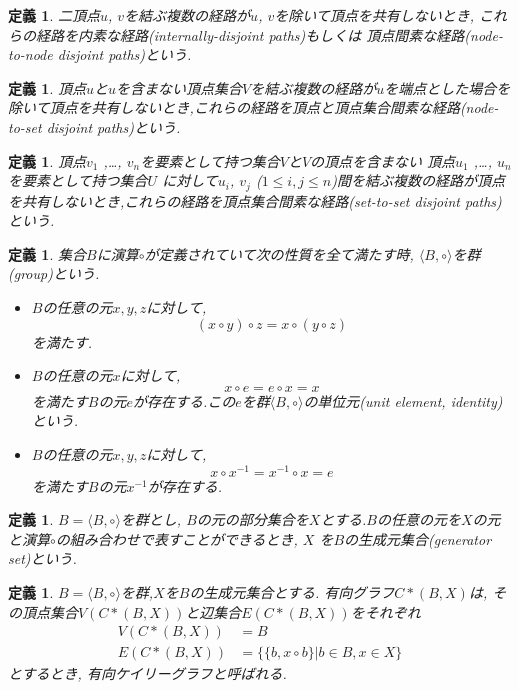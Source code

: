 \documentclass[11pt,a4j]{jsarticle}
\theoremstyle{plain}
\newtheorem{defi}[theo]{定義}
\def\vu{\mbox{\boldmath $u$}}
\def\vv{\mbox{\boldmath $v$}}
\def\node#1#2{\mbox{\boldmath $#1_{#2}$}}
\begin{document}
\begin{defi}
二頂点{\vu , \vv}を結ぶ複数の経路が{\vu , \vv}を除いて頂点を共有しないとき, これらの経路を内素な経路(internally-disjoint paths)もしくは
頂点間素な経路(node-to-node disjoint paths)という.
\end{defi}

\begin{defi}
頂点{\vu}と{\vu}を含まない頂点集合{$V$}を結ぶ複数の経路が{\vu}を端点とした場合を除いて頂点を共有しないとき,これらの経路を頂点と頂点集合間素な経路(node-to-set disjoint paths)という.
\end{defi}

\begin{defi}
頂点{\node v1 ,\dots , \node vn}を要素として持つ集合$V$と$V$の頂点を含まない
頂点{\node u1 ,\dots , \node un}を要素として持つ集合$U$ に対して{\node ui, \node vj ($1\leq i,j \leq n$)}間を結ぶ複数の経路が頂点を共有しないとき,これらの経路を頂点集合間素な経路(set-to-set disjoint paths)という.
\end{defi}

\begin{defi}
集合$B$に演算$\circ $が定義されていて次の性質を全て満たす時, $\langle B,\circ\rangle$を群(group)という.
\begin{itemize}
\item $B$の任意の元$x,y,z$に対して,\[ (x\circ y)\circ z = x\circ(y\circ z)\]を満たす.
\item $B$の任意の元$x$に対して,\[ x\circ e = e\circ x = x \]を満たす$B$の元$e$が存在する.この$e$を群$\langle B,\circ\rangle$の単位元(unit element, identity)という.
\item $B$の任意の元$x,y,z$に対して,\[ x\circ x^{-1} = x^{-1}\circ x = e\]を満たす$B$の元$x^{-1}$が存在する.
\end{itemize}
\end{defi}

\begin{defi}
$B = \langle B,\circ\rangle$を群とし, $B$の元の部分集合を$X$とする.$B$の任意の元を$X$の元と演算$\circ$の組み合わせで表すことができるとき, $X$ を$B$の生成元集合(generator set)という.
\end{defi}

\begin{defi}
$B = \langle B,\circ\rangle$を群,$X$を$B$の生成元集合とする. 有向グラフ$C*(B,X)$は, その頂点集合$V(C*(B,X))$と辺集合$E(C*(B,X))$をそれぞれ
\begin{equation*} 
	\begin{split}
	V(C*(B,X)) &= B \\
	E(C*(B,X)) &= \{\{b,x\circ b\}| b \in B, x \in X\} 
	\end{split}
\end{equation*}
とするとき, 有向ケイリーグラフと呼ばれる.
\end{defi}
\end{document}
